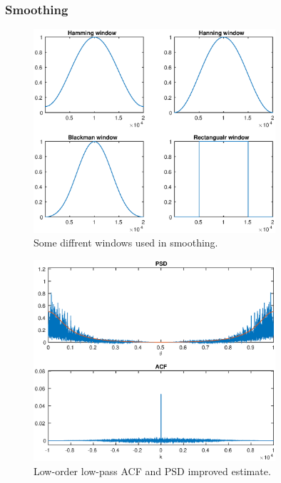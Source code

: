 \documentclass[a4paper,12pt]{article}
\begin{document}

\subsubsection{Smoothing}

\begin{figure}[h]
\centering
\includegraphics[width=0.8\textwidth]{bilder/Lab1/Lab1fig11.eps}
\caption{Some diffrent windows used in smoothing.}
\label{fig:Lab1fig11}
\end{figure}

\begin{figure}[h]
\centering
\includegraphics[width=0.8\textwidth]{bilder/Lab1/Lab1fig9.eps}
\caption{Low-order low-pass ACF and PSD improved estimate.}
\label{fig:Lab1fig9}
\end{figure}
\end{document}
